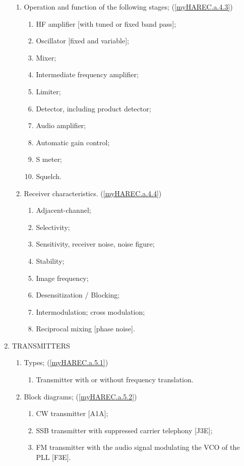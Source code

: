 \begin{enumerate}
\begin{enumerate}[noitemsep]
\item Operation and function of the following stages; (\ref{myHAREC.a.4.3})\label{HAREC.a.4.3}
\begin{enumerate}[noitemsep]
\item HF amplifier [with tuned or fixed band pass];
\item Oscillator [fixed and variable];
\item Mixer;
\item Intermediate frequency amplifier;
\item Limiter;
\item Detector, including product detector;
\item Audio amplifier;
\item Automatic gain control;
\item S meter;
\item Squelch.
\end{enumerate}
\item Receiver characteristics. (\ref{myHAREC.a.4.4})\label{HAREC.a.4.4}
\begin{enumerate}[noitemsep]
\item Adjacent-channel;
\item Selectivity;
\item Sensitivity, receiver noise, noise figure;
\item Stability;
\item Image frequency;
\item Desensitization / Blocking;
\item Intermodulation; cross modulation;
\item Reciprocal mixing [phase noise].
\end{enumerate}
\end{enumerate}
\item TRANSMITTERS
\begin{enumerate}[noitemsep]
\item Types; (\ref{myHAREC.a.5.1})\label{HAREC.a.5.1}
\begin{enumerate}[noitemsep]
\item Transmitter with or without frequency translation.
\end{enumerate}
\item Block diagrams; (\ref{myHAREC.a.5.2})\label{HAREC.a.5.2}
\begin{enumerate}[noitemsep]
\item CW transmitter [A1A];
\item SSB transmitter with suppressed carrier telephony [J3E];
\item FM transmitter with the audio signal modulating the VCO of the PLL [F3E].

\end{enumerate}
\end{enumerate}
\end{enumerate}
